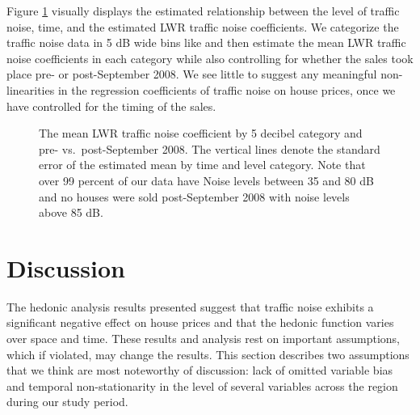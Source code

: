\documentclass{article}\usepackage{graphicx, color}
\begin{document}
Figure \ref{fig:betaMAXvCat} visually displays the estimated relationship between the level of traffic noise, time, and the estimated LWR traffic noise coefficients. We categorize the traffic noise data in 5 dB wide bins like \citet{Theebe2004a} and then estimate the mean LWR traffic noise coefficients in each category while also controlling for whether the sales took place pre- or post-September 2008. We see little to suggest any meaningful non-linearities in the regression coefficients of traffic noise on house prices, once we have controlled for the timing of the sales.

\begin{figure}
\caption{The mean LWR traffic noise coefficient by 5 decibel category and pre- vs.\ post-September 2008. The vertical lines denote the standard error of the estimated mean by time and level category. Note that over 99 percent of our data have Noise levels between 35 and 80 dB and no houses were sold post-September 2008 with noise levels above 85 dB.}\label{fig:betaMAXvCat}
\end{figure}


\section{Discussion}\label{Discussion}

The hedonic analysis results presented suggest that traffic noise exhibits a significant negative effect on house prices and that the hedonic function varies over space and time. These results and analysis rest on important assumptions, which if violated, may change the results. This section describes two assumptions that we think are most noteworthy of discussion: lack of omitted variable bias and temporal non-stationarity in the level of several variables across the region during our study period.
\end{document}
